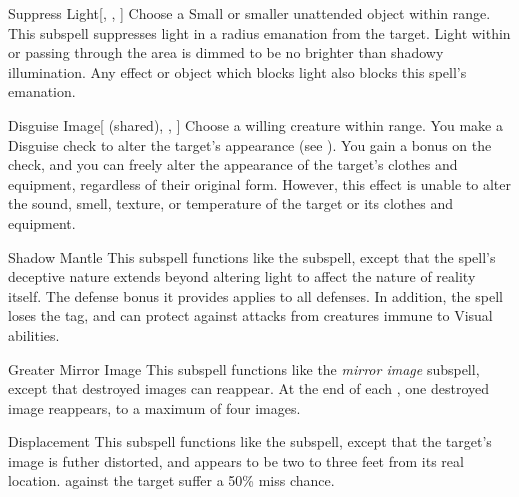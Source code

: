\begin{ability}[\nth{2}]{Suppress Light}[, , ]
Choose a Small or smaller unattended object within \rngclose range.
This subspell suppresses light in a \areamed radius emanation from the target.
Light within or passing through the area is dimmed to be no brighter than shadowy illumination.
Any effect or object which blocks light also blocks this spell's emanation.
\end{ability}
\vspace{0.25em}


\begin{ability}[\nth{3}]{Disguise Image}[ (shared), , ]
Choose a willing creature within \rngclose range.
You make a Disguise check to alter the target's appearance (see ).
You gain a  bonus on the check, and you can freely alter the appearance of the target's clothes and equipment, regardless of their original form.
However, this effect is unable to alter the sound, smell, texture, or temperature of the target or its clothes and equipment.
\end{ability}
\vspace{0.25em}


\begin{ability}[\nth{4}]{Shadow Mantle}
This subspell functions like the  subspell, except that the spell's deceptive nature extends beyond altering light to affect the nature of reality itself.
The defense bonus it provides applies to all defenses.
In addition, the spell loses the  tag, and can protect against attacks from creatures immune to Visual abilities.
\end{ability}
\vspace{0.25em}


\begin{ability}[\nth{5}]{Greater Mirror Image}
This subspell functions like the \textit{mirror image} subspell, except that destroyed images can reappear.
At the end of each , one destroyed image reappears, to a maximum of four images.
\end{ability}
\vspace{0.25em}


\begin{ability}[\nth{7}]{Displacement}
This subspell functions like the  subspell, except that the target's image is futher distorted, and appears to be two to three feet from its real location.
  against the target suffer a 50\% miss chance.
\end{ability}
\vspace{0.25em}

